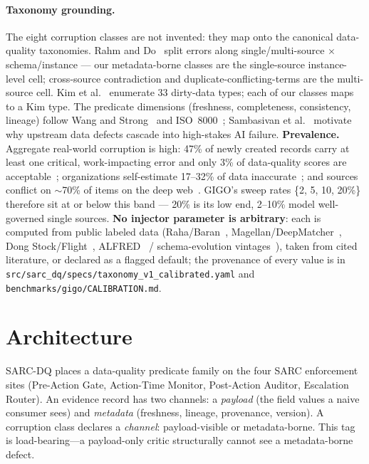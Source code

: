 \documentclass[11pt]{article}
\theoremstyle{plain}
\theoremstyle{definition}
\begin{document}
\paragraph{Taxonomy grounding.} The eight corruption classes are not invented: they
map onto the canonical data-quality taxonomies. Rahm and Do~\cite{rahmdo2000} split
errors along single/multi-source $\times$ schema/instance --- our metadata-borne
classes are the single-source instance-level cell; cross-source contradiction and
duplicate-conflicting-terms are the multi-source cell. Kim et al.~\cite{kim2003}
enumerate 33 dirty-data types; each of our classes maps to a Kim type. The predicate
dimensions (freshness, completeness, consistency, lineage) follow Wang and
Strong~\cite{wangstrong1996} and ISO~8000~\cite{iso8000}; Sambasivan et
al.~\cite{sambasivan2021} motivate why upstream data defects cascade into
high-stakes AI failure. \textbf{Prevalence.} Aggregate real-world corruption is
high: 47\% of newly created records carry at least one critical, work-impacting
error and only 3\% of data-quality scores are acceptable~\cite{nagle2017};
organizations self-estimate 17--32\% of data inaccurate~\cite{experian2017}; and
sources conflict on $\sim$70\% of items on the deep web~\cite{li2013}. GIGO's
sweep rates \{2, 5, 10, 20\%\} therefore sit at or below this band --- 20\% is its
low end, 2--10\% model well-governed single sources. \textbf{No injector parameter
is arbitrary}: each is computed from public labeled data (Raha/Baran~\cite{mahdavi2019},
Magellan/DeepMatcher~\cite{konda2016}, Dong Stock/Flight~\cite{li2013},
ALFRED~\cite{alfred} /
schema-evolution vintages~\cite{curino2013}), taken from cited literature, or declared
as a flagged default; the provenance of every value is in
\texttt{src/sarc\_dq/specs/taxonomy\_v1\_calibrated.yaml} and
\texttt{benchmarks/gigo/CALIBRATION.md}.

\section{Architecture}\label{sec:arch}
SARC-DQ places a data-quality predicate family on the four SARC enforcement sites
(Pre-Action Gate, Action-Time Monitor, Post-Action Auditor, Escalation Router). An
evidence record has two channels: a \emph{payload} (the field values a naive
consumer sees) and \emph{metadata} (freshness, lineage, provenance, version). A
corruption class declares a \emph{channel}: payload-visible or metadata-borne. This
tag is load-bearing---a payload-only critic structurally cannot see a metadata-borne
defect.
\end{document}
